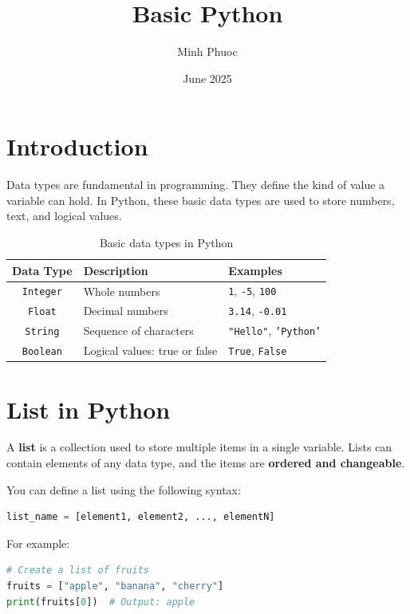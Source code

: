 \documentclass{article}
\title{Basic Python}
\author{Minh Phuoc}
\date{June 2025}
\begin{document}
\maketitle

\section{Introduction}

Data types are fundamental in programming.  
They define the kind of value a variable can hold.  
In Python, these basic data types are used to store numbers, text, and logical values.

\begin{table}[H]
\centering
\begin{tabular}{|c|l|l|}
\hline
\textbf{Data Type} & \textbf{Description} & \textbf{Examples} \\ \hline
\texttt{Integer} & Whole numbers & \texttt{1}, \texttt{-5}, \texttt{100} \\ \hline
\texttt{Float} & Decimal numbers & \texttt{3.14}, \texttt{-0.01} \\ \hline
\texttt{String} & Sequence of characters & \texttt{"Hello"}, \texttt{'Python'} \\ \hline
\texttt{Boolean} & Logical values: true or false & \texttt{True}, \texttt{False} \\ \hline
\end{tabular}
\caption{Basic data types in Python}
\end{table}

\section{List in Python}

A \textbf{list} is a collection used to store multiple items in a single variable.  
Lists can contain elements of any data type, and the items are \textbf{ordered and changeable}.

You can define a list using the following syntax:
\begin{lstlisting}[language=Python]
list_name = [element1, element2, ..., elementN]
\end{lstlisting}

For example:
\begin{lstlisting}[language=Python]
# Create a list of fruits
fruits = ["apple", "banana", "cherry"]
print(fruits[0])  # Output: apple
\end{lstlisting}
\end{document}
